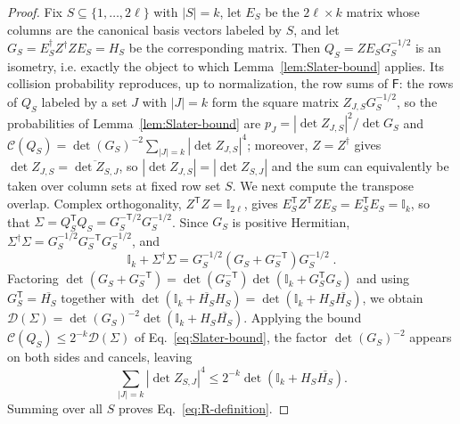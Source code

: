 \documentclass[aps,prl,twocolumn,superscriptaddress,reprint,longbibliography,nofootinbib]{revtex4-2}
\newcommand{\trans}{\mathsf{T}}
\begin{document}
\begin{proof}

Fix $S\subseteq\{1,\dots,2\ell\}$ with $|S|=k$, let $E_S$ be the $2\ell\times k$ matrix whose columns are the canonical basis vectors labeled by $S$, and let $G_S=E_S^\dagger Z^\dagger ZE_S=H_S$ be the corresponding matrix. Then $Q_S=ZE_SG_S^{-1/2}$ is an isometry, i.e. exactly the object to which Lemma~\ref{lem:Slater-bound} applies.
Its collision probability reproduces, up to normalization, the row sums of $\mathsf{F}$: the rows of $Q_S$ labeled by a set $J$ with $|J|=k$ form the square matrix $Z_{J,S}G_S^{-1/2}$, so the probabilities of Lemma~\ref{lem:Slater-bound} are $p_J=|\det Z_{J,S}|^2/\det G_S$ and $\mathcal{C}(Q_S)=\det(G_S)^{-2}\sum_{|J|=k}|\det Z_{J,S}|^4$; moreover, $Z=Z^\dagger$ gives $\det Z_{J,S}=\overline{\det Z_{S,J}}$, so $|\det Z_{J,S}|=|\det Z_{S,J}|$ and the sum can equivalently be taken over column sets at fixed row set $S$. We next compute the transpose overlap. Complex orthogonality, $Z^{\trans}Z=\mathbb{I}_{2\ell}$, gives $E_S^{\trans}Z^{\trans}ZE_S=E_S^{\trans}E_S=\mathbb{I}_k$, so that $\Sigma=Q_S^{\trans}Q_S=G_S^{-\trans/2}G_S^{-1/2}$. Since $G_S$ is positive Hermitian, $\Sigma^\dagger\Sigma=G_S^{-1/2}G_S^{-\trans}G_S^{-1/2}$, and
\begin{equation}
\mathbb{I}_k+\Sigma^\dagger\Sigma=G_S^{-1/2}\left(G_S+G_S^{-\trans}\right)G_S^{-1/2}\;.
\end{equation}%
Factoring $\det(G_S+G_S^{-\trans})=\det(G_S^{-\trans})\det(\mathbb{I}_k+G_S^{\trans}G_S)$ and using $G_S^{\trans}=\overline{H_S}$ together with $\det(\mathbb{I}_k+\overline{H_S}H_S)=\det(\mathbb{I}_k+H_S\overline{H_S})$, we obtain $\mathcal{D}(\Sigma)=\det(G_S)^{-2}\det(\mathbb{I}_k+H_S\overline{H_S})$. Applying the bound $\mathcal{C}(Q_S)\le2^{-k}\mathcal{D}(\Sigma)$ of Eq.~\eqref{eq:Slater-bound}, the factor $\det(G_S)^{-2}$ appears on both sides and cancels, leaving
\begin{equation}
    \sum_{|J|=k}\left|\det Z_{S,J}\right|^4\le 2^{-k}\det\!\left(\mathbb{I}_k+H_S\overline{H_S}\right).
\end{equation}
Summing over all $S$ proves Eq.~\eqref{eq:R-definition}.


\end{proof}
\end{document}
